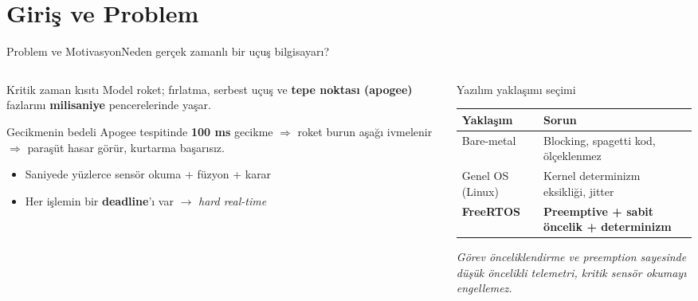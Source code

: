 \section{Giriş ve Problem}

\begin{frame}{Problem ve Motivasyon}{Neden gerçek zamanlı bir uçuş bilgisayarı?}
  \begin{columns}[T]
    \begin{column}{0.52\textwidth}
      \begin{block}{Kritik zaman kısıtı}
        Model roket; fırlatma, serbest uçuş ve \textbf{tepe noktası (apogee)} fazlarını
        \textbf{milisaniye} pencerelerinde yaşar.
      \end{block}
      \vspace{1pt}
      \begin{alertblock}{Gecikmenin bedeli}
        \footnotesize Apogee tespitinde \textbf{100 ms} gecikme $\Rightarrow$ roket burun aşağı
        ivmelenir $\Rightarrow$ paraşüt hasar görür, kurtarma başarısız.
      \end{alertblock}
      \vspace{1pt}
      \begin{itemize}\setlength{\itemsep}{1pt}
        \item \footnotesize Saniyede yüzlerce sensör okuma + füzyon + karar
        \item \footnotesize Her işlemin bir \textbf{deadline}'ı var $\rightarrow$
              \emph{hard real-time}
      \end{itemize}
    \end{column}
    \begin{column}{0.48\textwidth}
      \begin{exampleblock}{Yazılım yaklaşımı seçimi}
        \footnotesize
        \begin{tabular}{@{}p{2.3cm}p{4.2cm}@{}}
          \toprule
          \textbf{Yaklaşım} & \textbf{Sorun} \\
          \midrule
          Bare-metal & Blocking, spagetti kod, ölçeklenmez \\[3pt]
          Genel OS (Linux) & Kernel determinizm eksikliği, jitter \\[3pt]
          \textbf{FreeRTOS} & \textcolor{izuBordo}{\textbf{Preemptive + sabit öncelik + determinizm}} \\
          \bottomrule
        \end{tabular}
      \end{exampleblock}
      \centering
      \footnotesize\textit{Görev önceliklendirme ve preemption sayesinde\\ düşük öncelikli telemetri, kritik sensör okumayı engellemez.}
    \end{column}
  \end{columns}
\end{frame}

